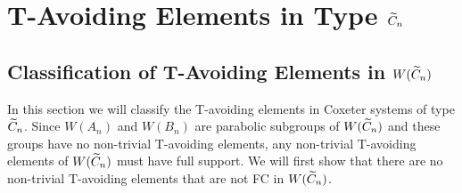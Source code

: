 \chapter{T-Avoiding Elements in Type $\widetilde{C}_n$}\label{chap:Cn}



\section{Classification of T-Avoiding Elements in $W(\widetilde{C}_n)$}

In this section we will classify the T-avoiding elements in Coxeter systems of type $\widetilde{C}_n$. Since $W(A_n)$ and $W(B_n)$ are parabolic subgroups of $W(\widetilde{C}_n)$ and these groups have no non-trivial T-avoiding elements,  any non-trivial T-avoiding elements of $W(\widetilde{C}_n)$ must have full support. We will first show that there are no non-trivial T-avoiding elements that are not FC in $W(\widetilde{C}_n)$.

